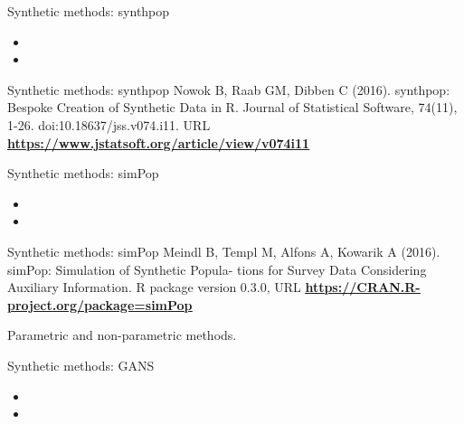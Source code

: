 \documentclass[
	11pt, %
]{beamer}
\begin{document}
\begin{frame}{Synthetic methods: synthpop}
\label{synthetic-methods-synthpop}
\begin{itemize}
\item
  \color{red}{Generating synthetic data with synthpop}
\item
  \Huge \color{red}{for Jiri/Oscar}
\end{itemize}
\end{frame}

\begin{frame}{Synthetic methods: synthpop}
\label{synthetic-methods-synthpop-1}
Nowok B, Raab GM, Dibben C (2016). synthpop: Bespoke Creation of
Synthetic Data in R. Journal of Statistical Software, 74(11), 1-26.
doi:10.18637/jss.v074.i11. URL
\href{https://www.jstatsoft.org/article/view/v074i11}{\color{blue}\underline{\textbf{https://www.jstatsoft.org/article/view/v074i11}}}
\end{frame}

\begin{frame}{Synthetic methods: simPop}
\label{synthetic-methods-simpop}
\begin{itemize}
\item
  \color{red}{Generating synthetic data with simPop}
\item
  \Huge \color{red}{for Jiri/Oscar}
\end{itemize}
\end{frame}

\begin{frame}{Synthetic methods: simPop}
\label{synthetic-methods-simpop-1}
Meindl B, Templ M, Alfons A, Kowarik A (2016). simPop: Simulation of
Synthetic Popula- tions for Survey Data Considering Auxiliary
Information. R package version 0.3.0, URL
\href{https://CRAN.R-project.org/package=simPop}{\color{blue}\underline{\textbf{https://CRAN.R-project.org/package=simPop}}}

Parametric and non-parametric methods.
\end{frame}

\begin{frame}{Synthetic methods: GANS}
\label{synthetic-methods-gans}
\begin{itemize}
\item
  \color{red}{Generating synthetic data with GANs}
\item
  \Huge \color{red}{for Marco}
\end{itemize}
\end{frame}
\end{document}
